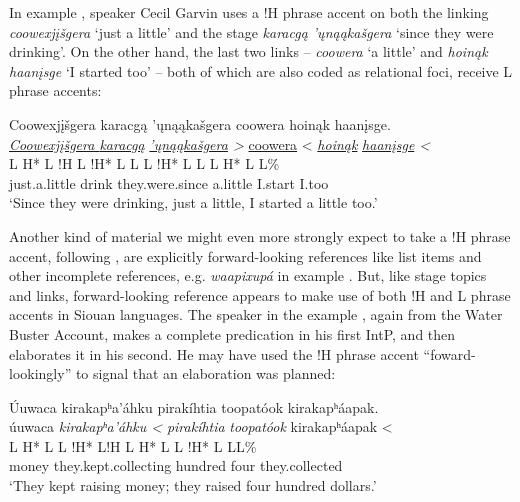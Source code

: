 \documentclass[output=paper]{LSP/langsci}
\begin{document}
In example ,  speaker Cecil Garvin uses a !H phrase accent on both the linking \emph{coowexjįšgera} `just a little' and the stage  \emph{karacgą ’ųnąąkašgera} `since they were drinking'. On the other hand, the last two links -- \emph{coowera} `a little' and \emph{hoinąk haanįsge} `I started too' -- both of which are also coded as relational foci, receive L phrase accents:

\ea\label{garvinphraseaccent}
 	Coowexjįšgera karacgą ’ųnąąkašgera coowera hoinąk haanįsge.\footnotemark\\
\glll	\emph{\underline{Coowexjįšgera	}}	\emph{\underline{karacgą}}	\emph{\underline{’ųnąąkašgera}	>}	{\underline{coowera} <}	\emph{\underline{hoinąk}}	\emph{\underline{haanįsge} <}\\
	{\ob L H* L !H\cb}				{\ob L !H* L}				{L\cb}	{\ob L !H* L L\cb}		{\ob L H* L}						{\hspaceThis{haanįs}\ob\hspaceThis{ }L\%}\\
	just.a.little					drink					they.were.since				a.little				I.start						I.too\\
\glt	`Since they were drinking, just a little, I started a little too.'
\z

Another kind of material we might even more strongly expect to take a !H phrase accent, following \citet{PierrehumbertHirschberg1990}, are explicitly forward-looking references like list items and other incomplete references, e.g. \emph{waapixupá} in example . But, like stage topics and links, forward-looking reference appears to make use of both !H and L phrase accents in Siouan languages. The speaker in the  example , again from the Water Buster Account, makes a complete predication in his first IntP, and then elaborates it in his second. He may have used the !H phrase accent “foward-lookingly” to signal that an elaboration was planned:

\ea\label{waterbusterincomplete}
 	Úuwaca kirakapʰa’áhku pirakíhtia toopatóok kirakapʰáapak.\footnotemark\\
\glll	úuwaca	\emph{kirakapʰa’áhku <}		\emph{pirakíhtia}	\emph{toopatóok}	{kirakapʰáapak <}\\
	{\ob L H* L}	{L !H* L!H\cb}	{\ob L H* L}		{}			{L !H* L L\cb{}L\%}\\
	money	they.kept.collecting			hundred		four			they.collected\\
\glt	`They kept raising money; they raised four hundred dollars.'
\z
\end{document}
